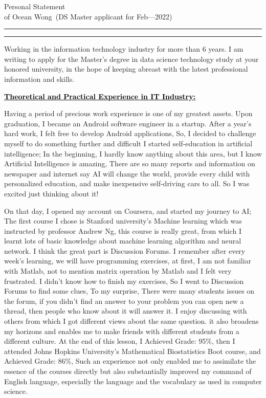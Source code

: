 \documentclass{article}
\newcommand{\soptitle}{Personal Statement}
\newcommand{\yourname}{Ocean Wong}
\newcommand{\statement}[1]{\par\medskip
  \underline{\textcolor{black}{\textbf{#1:}}}\space
}
\begin{document}
\begin{center}\LARGE\soptitle\\
\large of \yourname\ (DS Master applicant for Feb---2022)
\end{center}

\hrule
\vspace{1pt}
\hrule height 1pt

\bigskip

Working in the information technology industry for more than 6 years. I am writing to apply for the Master's degree in data science technology study at your honored university, in the hope of keeping abreast with the latest professional information and skills.

\statement{Theoretical and Practical Experience in IT Industry}
Having a period of precious work experience is one of my greatest assets. Upon graduation, I became an Android software engineer in a startup. After a year's hard work, I felt free to develop Android applications, So, I decided to challenge myself to do something further and difficult
I started self-education in artificial intelligence; In the beginning, I hardly know anything about this area, but I know Artificial Intelligence is amazing, There are so many reports and information on newspaper and internet say AI will change the world, provide every child with personalized education, and make inexpensive self-driving cars to all. So I was excited just thinking about it! 


On that day, I opened my account on Coursera, and started my journey to AI; The first course I chose is Stanford university's Machine learning which was instructed by professor Andrew Ng, this course is really great, from which I learnt lots of basic knowledge about machine learning algorithm and neural network. I think the great part is Discussion Forums. I remember after every week's learning, we will have programming exercises, at first, I am not familiar with Matlab, not to mention matrix operation by Matlab and I felt very frustrated. I didn't know how to finish my exercises, So I went to Discussion Forums to find some clues, To my surprise, There were many students issues on the forum, if you didn't find an answer to your problem you can open new a thread, then people who know about it will answer it. I enjoy discussing with others from which I got different views about the same question. it also broadens my horizons and enables me to make friends with different students from a different culture. At the end of this lesson, I Achieved Grade: 95\%, then I attended Johns Hopkins University's Mathematical Biostatistics Boot course, and Achieved Grade: 86\%, Such an experience not only enabled me to assimilate the essence of the courses directly but also substantially improved my command of English language, especially the language and the vocabulary as used in computer science.
\end{document}
